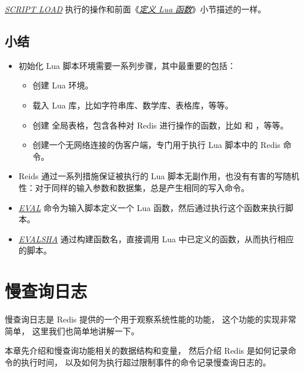 \documentclass[a4paper,11pt,english]{sphinxmanual}
\begin{document}
\href{http://redis.readthedocs.org/en/latest/script/script\_load.html\#script-load}{\emph{SCRIPT LOAD}} 执行的操作和前面《{\hyperref[feature/scripting:define-lua-function]{\emph{定义 Lua 函数}}}》小节描述的一样。


\subsection{小结}
\label{feature/scripting:id8}\begin{itemize}
\item {} 
初始化 Lua 脚本环境需要一系列步骤，其中最重要的包括：
\begin{itemize}
\item {} 
创建 Lua 环境。

\item {} 
载入 Lua 库，比如字符串库、数学库、表格库，等等。

\item {} 
创建  全局表格，包含各种对 Redis 进行操作的函数，比如  和  ，等等。

\item {} 
创建一个无网络连接的伪客户端，专门用于执行 Lua 脚本中的 Redis 命令。

\end{itemize}

\item {} 
Reids 通过一系列措施保证被执行的 Lua 脚本无副作用，也没有有害的写随机性：对于同样的输入参数和数据集，总是产生相同的写入命令。

\item {} 
\href{http://redis.readthedocs.org/en/latest/script/eval.html\#eval}{\emph{EVAL}} 命令为输入脚本定义一个 Lua 函数，然后通过执行这个函数来执行脚本。

\item {} 
\href{http://redis.readthedocs.org/en/latest/script/evalsha.html\#evalsha}{\emph{EVALSHA}} 通过构建函数名，直接调用 Lua 中已定义的函数，从而执行相应的脚本。

\end{itemize}


\section{慢查询日志}
\label{feature/slowlog::doc}\label{feature/slowlog:id1}
慢查询日志是 Redis 提供的一个用于观察系统性能的功能，
这个功能的实现非常简单，
这里我们也简单地讲解一下。

本章先介绍和慢查询功能相关的数据结构和变量，
然后介绍 Redis 是如何记录命令的执行时间，
以及如何为执行超过限制事件的命令记录慢查询日志的。
\end{document}
